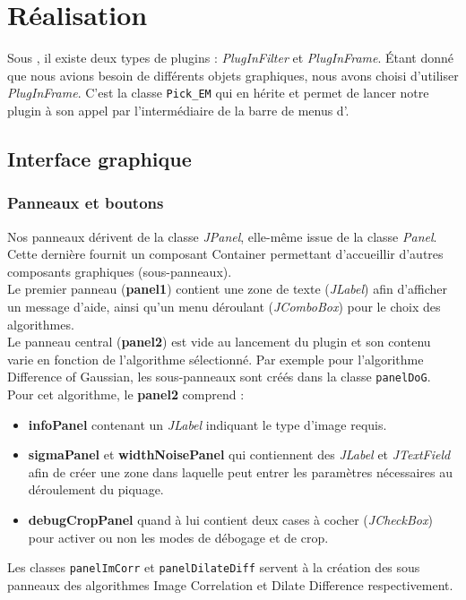 \chapter{Réalisation}

Sous \imj, il existe deux types de plugins : \emph{PlugInFilter} et \emph{PlugInFrame}. Étant donné que nous avions besoin de différents objets graphiques, nous avons choisi d'utiliser \emph{PlugInFrame}. C'est la classe \texttt{Pick\_EM} qui en hérite et permet de lancer notre plugin à son appel par l'intermédiaire de la barre de menus d'\imj.

\section{Interface graphique}

\subsection{Panneaux et boutons}

Nos panneaux dérivent de la classe \emph{JPanel}, elle-même issue de la classe \emph{Panel}. Cette dernière fournit un composant Container permettant d'accueillir d'autres composants graphiques (sous-panneaux).\\

Le premier panneau (\textbf{panel1}) contient une zone de texte (\emph{JLabel}) afin d'afficher un message d'aide, ainsi qu'un menu déroulant (\emph{JComboBox}) pour le choix des algorithmes. \\

Le panneau central (\textbf{panel2}) est vide au lancement du plugin et son contenu varie en fonction de l'algorithme sélectionné. Par exemple pour l'algorithme Difference of Gaussian, les sous-panneaux sont créés dans la classe \texttt{panelDoG}. Pour cet algorithme, le \textbf{panel2} comprend :
\begin{itemize}
\item \textbf{infoPanel} contenant un \emph{JLabel} indiquant le type d'image requis.
\item \textbf{sigmaPanel} et \textbf{widthNoisePanel} qui contiennent des \emph{JLabel} et \emph{JTextField} afin de créer une zone dans laquelle peut entrer les paramètres nécessaires au déroulement du piquage. 
\item \textbf{debugCropPanel} quand à lui contient deux cases à cocher (\emph{JCheckBox}) pour activer ou non les modes de débogage et de crop. 
\end{itemize}
Les classes \texttt{panelImCorr} et \texttt{panelDilateDiff} servent à la création des sous panneaux des algorithmes Image Correlation et Dilate Difference respectivement. \\

